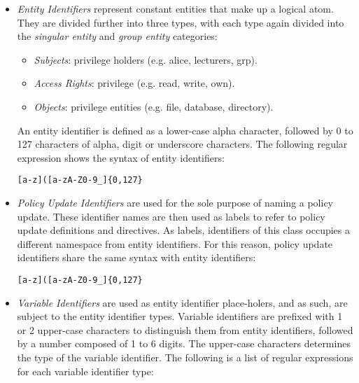 \documentclass[10pt, twocolumn]{article}
\begin{document}
          \begin{itemize}
            \item
              {\em Entity Identifiers} represent constant entities that make up
              a logical atom. They are divided further into three types, with
              each type again divided into the {\em singular entity} and
              {\em group entity} categories:

              \begin{itemize}
                \item
                  {\em Subjects}: privilege holders (e.g. alice, lecturers,
                  grp).
                \item
                  {\em Access Rights}: privilege (e.g. read, write, own).
                \item
                  {\em Objects}: privilege entities (e.g. file, database,
                  directory).
              \end{itemize}

              An entity identifier is defined as a lower-case alpha character,
              followed by 0 to 127 characters of alpha, digit or underscore
              characters. The following regular expression shows the syntax
              of entity identifiers:

              \begin{verbatim}[a-z]([a-zA-Z0-9_]{0,127}\end{verbatim}

            \item
              {\em Policy Update Identifiers} are used for the sole purpose of
              naming a policy update. These identifier names are then used as
              labels to refer to policy update definitions and directives. As
              labels, identifiers of this class occupies a different namespace
              from entity identifiers. For this reason, policy update
              identifiers share the same syntax with entity identifiers:

              \begin{verbatim}[a-z]([a-zA-Z0-9_]{0,127}\end{verbatim}
 
            \item
              {\em Variable Identifiers} are used as entity identifier
              place-holers, and as such, are subject to the entity identifier
              types. Variable identifiers are prefixed with 1 or 2 upper-case
              characters to distinguish them from entity identifiers, followed
              by a number composed of 1 to 6 digits. The upper-case characters
              determines the type of the variable identifier. The following is
              a list of regular expressions for each variable identifier type:


\end{itemize}
\end{document}
